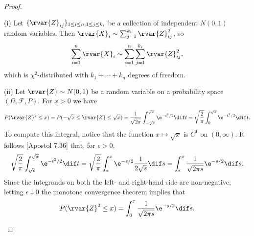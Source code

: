 \documentclass[article, a4paper, 11pt, oneside]{memoir}
\numberwithin{equation}{chapter}
\newcommand{\calF}{\mathcal{F}}
\begin{document}
\begin{proof}
\begin{proofsec}
    \item[(i)]
    Let $\{\rvar{Z}_{ij}\}_{1 \leq i \leq n, 1 \leq j \leq k_i}$ be a collection of independent $N(0,1)$ random variables. Then $\rvar{X}_i \sim \sum_{j=1}^{k_i} \rvar{Z}_{ij}^2$, so
    \begin{equation*}
        \sum_{i=1}^n \rvar{X}_i
            \sim \sum_{i=1}^n \sum_{j=1}^{k_i} \rvar{Z}_{ij}^2,
    \end{equation*}
    which is $\chi^2$-distributed with $k_1 + \cdots + k_n$ degrees of freedom.

    \item[(ii)]
    Let $\rvar{Z} \sim N(0,1)$ be a random variable on a probability space $(\Omega,\calF,P)$. For $x > 0$ we have
    \begin{equation*}
        P(\rvar{Z}^2 \leq x)
            = P(-\sqrt{x} \leq \rvar{Z} \leq \sqrt{x})
            = \frac{1}{\sqrt{2\pi}} \int_{-\sqrt{x}}^{\sqrt{x}} \e^{-t^2/2} \dif t
            = \sqrt{\frac{2}{\pi}} \int_0^{\sqrt{x}} \e^{-t^2/2} \dif t.
    \end{equation*}
    To compute this integral, notice that the function $x \mapsto \sqrt{x}$ is $C^1$ on $(0,\infty)$. It follows [Apostol 7.36] that, for $\epsilon > 0$,
    \begin{equation*}
        \sqrt{\frac{2}{\pi}} \int_{\sqrt{\epsilon}}^{\sqrt{x}} \e^{-t^2/2} \dif t
            = \sqrt{\frac{2}{\pi}} \int_\epsilon^x \e^{-s/2} \frac{1}{2\sqrt{s}} \dif s
            = \int_\epsilon^x \frac{1}{\sqrt{2\pi s}} \e^{-s/2} \dif s.
    \end{equation*}
    Since the integrands on both the left- and right-hand side are non-negative, letting $\epsilon \downarrow 0$ the monotone convergence theorem implies that
    \begin{equation*}
        P(\rvar{Z}^2 \leq x)
            = \int_0^x \frac{1}{\sqrt{2\pi s}} \e^{-s/2} \dif s.
    \end{equation*}

\end{proofsec}
\end{proof}
\end{document}
